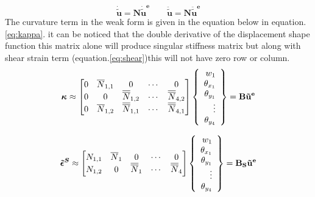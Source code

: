 \documentclass[main.tex]{subfiles}
\begin{document}
\begin{equation}
 \mathbf{ \dot{\tilde{u}} }  = \mathbf{N}              \mathbf{\dot{\tilde{u}}^e}
 \qquad  
 \mathbf{ \ddot{\tilde{u}} } = \mathbf{N}  \mathbf{\ddot{\tilde{u}}^e}
\end{equation}
The curvature term in the weak form is given in the equation below in equation.\ref{eq:kappa}. it can be noticed that the double derivative of the displacement shape function this matrix alone will produce singular stiffness matrix but along with shear strain term (equation.\ref{eq:shear})this will not have zero row or column. 
\begin{equation}\label{eq:kappa}
\boldsymbol{ \kappa }  \approx
\begin{bmatrix}
0 & \overline{N}_{1,1} & 0 & \cdots & 0 \\
0&  0 & \overline{\overline{N}}_{1,2}  & \cdots & \overline{\overline{N}}_{4,2} 
\\
0&  \overline{N}_{1,2} & \overline{\overline{N}}_{1,1}  & \cdots & \overline{\overline{N}}_{4,1} 
\end{bmatrix} 
\left\{
\begin{array}{r}
w_1 \\
\theta_{x_1} \\
\theta_{y_1} \\
\vdots \\
\theta_{y_{4}} \\
\end{array} \right\}=\mathbf{ B } \mathbf{\tilde{u}^e}
\end{equation}


\begin{equation} \label{eq:shear}
\boldsymbol{\tilde{\epsilon}^S}  \approx 
\begin{bmatrix}
N_{1,1} & \overline{N}_{1} & 0 & \cdots & 0 
\\
N_{1,2} & 0 & \overline{\overline{N}}_{1} & \cdots & \overline{\overline{N}}_{4} 
\end{bmatrix} 
\left\{
\begin{array}{r}
w_1 \\
\theta_{x_1} \\
\theta_{y_1} \\
\vdots \\
\theta_{y_{4}} \\
\end{array} \right\}=\mathbf{ B_S } \mathbf{\tilde{u}^e}
\end{equation}
\end{document}
